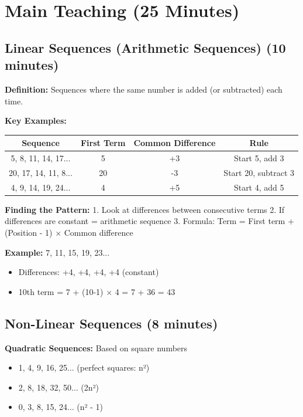 \documentclass{article}
\begin{document}
\section{Main Teaching (25 Minutes)}

\subsection{Linear Sequences (Arithmetic Sequences) (10 minutes)}

\textbf{Definition:} Sequences where the same number is added (or subtracted) each time.

\textbf{Key Examples:}
\begin{center}
\begin{tabular}{|c|c|c|c|}
\hline
\textbf{Sequence} & \textbf{First Term} & \textbf{Common Difference} & \textbf{Rule} \\
\hline
5, 8, 11, 14, 17... & 5 & +3 & Start 5, add 3 \\
\hline
20, 17, 14, 11, 8... & 20 & -3 & Start 20, subtract 3 \\
\hline
4, 9, 14, 19, 24... & 4 & +5 & Start 4, add 5 \\
\hline
\end{tabular}
\end{center}

\textbf{Finding the Pattern:}
1. Look at differences between consecutive terms
2. If differences are constant = arithmetic sequence
3. Formula: Term = First term + (Position - 1) × Common difference

\textbf{Example:} 7, 11, 15, 19, 23...
\begin{itemize}
    \item Differences: +4, +4, +4, +4 (constant)
    \item 10th term = 7 + (10-1) × 4 = 7 + 36 = 43
\end{itemize}

\subsection{Non-Linear Sequences (8 minutes)}

\textbf{Quadratic Sequences:} Based on square numbers
\begin{itemize}
    \item 1, 4, 9, 16, 25... (perfect squares: n²)
    \item 2, 8, 18, 32, 50... (2n²)
    \item 0, 3, 8, 15, 24... (n² - 1)
\end{itemize}
\end{document}
